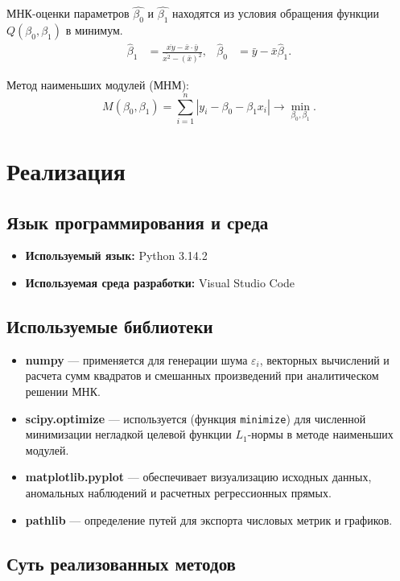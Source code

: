 \documentclass[a4paper, 14pt]{extarticle}
\begin{document}
МНК-оценки параметров $\widehat{\beta_0}$ и $\widehat{\beta_1}$ находятся из условия обращения функции $Q(\beta_0,\beta_1)$ в минимум.
\begin{align*}
    \widehat{\beta}_1 &= \frac{\overline{xy} - \bar{x} \cdot \bar{y}}{\overline{x^2} - (\bar{x})^2}, & \widehat{\beta}_0 &= \bar{y} - \bar{x}\widehat{\beta}_1.
\end{align*}

Метод наименьших модулей (МНМ):
\begin{equation*}
    M(\beta_0, \beta_1) = \sum_{i=1}^n |y_i - \beta_0 - \beta_1 x_i| \to \min_{\beta_0, \beta_1}.
\end{equation*}

\section{Реализация}

\subsection{Язык программирования и среда}
\begin{itemize}
    \item \textbf{Используемый язык:} Python 3.14.2
    \item \textbf{Используемая среда разработки:} Visual Studio Code
\end{itemize}

\subsection{Используемые библиотеки}
\begin{itemize}
    \item \textbf{numpy} --- применяется для генерации шума $\varepsilon_i$, векторных вычислений и расчета сумм квадратов и смешанных произведений при аналитическом решении МНК.
    \item \textbf{scipy.optimize} --- используется (функция \texttt{minimize}) для численной минимизации негладкой целевой функции $L_1$-нормы в методе наименьших модулей.
    \item \textbf{matplotlib.pyplot} --- обеспечивает визуализацию исходных данных, аномальных наблюдений и расчетных регрессионных прямых.
    \item \textbf{pathlib} --- определение путей для экспорта числовых метрик и графиков.
\end{itemize}

\subsection{Суть реализованных методов}
\end{document}
